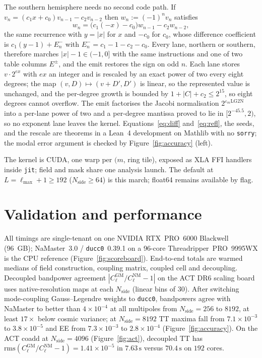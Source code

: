 \documentclass[letters,usenatbib,useAMS]{mnras}
\begin{document}
The southern hemisphere needs no second code path. If $v_n=(c_1x+c_0)v_{n-1}-c_2v_{n-2}$ then $w_n:=(-1)^nv_n$ satisfies
\begin{equation}
\label{eq:refl}
  w_n=\bigl(c_1(-x)-c_0\bigr)w_{n-1}-c_2w_{n-2},
\end{equation}
the same recurrence with $y=\lvert x\rvert$ for $x$ and $-c_0$ for $c_0$, whose difference coefficient is $c_1(y-1)+E^-_n$ with $E^-_n=c_1-1-c_2-c_0$. Every lane, northern or southern, therefore marches $\lvert x\rvert-1\in(-1,0]$ with the same instructions and one of two table columns $E^\pm$, and the emit restores the sign on odd $n$. Each lane stores $v\cdot2^{ex}$ with $ex$ an integer and is rescaled by an exact power of two every eight degrees; the map $(v,D)\mapsto(v+D',D')$ is linear, so the represented value is unchanged, and the per-degree growth is bounded by $1+\lvert C\rvert+c_2\le2^{15}$, so eight degrees cannot overflow. The emit factorises the Jacobi normalisation $2^{\varepsilon_m\mathrm{LG2N}}$ into a per-lane power of two and a per-degree mantissa proved to lie in $[2^{-45.5},2)$, so no exponent lane leaves the kernel. Equations~\eqref{eq:diff} and~\eqref{eq:refl}, the seeds, and the rescale are theorems in a Lean~4 development on Mathlib with no \texttt{sorry}; the modal error argument is checked by Figure~\ref{fig:accuracy} (left).

The kernel is CUDA, one warp per $(m$, ring tile), exposed as XLA FFI handlers inside \texttt{jit}; field and mask share one analysis launch. The default at $L=\ell_{\max}+1\ge192$ ($N_{\mathrm{side}}\ge64$) is this march; float64 remains available by flag.

\section{Validation and performance}

All timings are single-tenant on one NVIDIA RTX~PRO~6000 Blackwell (96~GB); NaMaster~3.0 / \texttt{ducc0}~0.39.1 on a 96-core Threadripper~PRO~9995WX is the CPU reference (Figure~\ref{fig:scoreboard}). End-to-end totals are warmed medians of field construction, coupling matrix, coupled cell and decoupling. Decoupled bandpower agreement $|C_\ell^{\mathrm{GM}}/C_\ell^{\mathrm{NM}}-1|$ on the ACT DR6 scaling board uses native-resolution maps at each $N_{\mathrm{side}}$ (linear bins of $30$). After switching mode-coupling Gauss--Legendre weights to \texttt{ducc0}, bandpowers agree with NaMaster to better than $4\times10^{-4}$ at all multipoles from $N_{\mathrm{side}}=256$ to $8192$, at least $17\times$ below cosmic variance; at $N_{\mathrm{side}}=8192$ TT maxima fall from $7.1\times10^{-3}$ to $3.8\times10^{-5}$ and EE from $7.3\times10^{-3}$ to $2.8\times10^{-4}$ (Figure~\ref{fig:accuracy}). On the ACT coadd at $N_{\mathrm{side}}=4096$ (Figure~\ref{fig:act}), decoupled TT has $\mathrm{rms}(C_\ell^{\mathrm{GM}}/C_\ell^{\mathrm{NM}}-1)=1.41\times10^{-5}$ in $7.63\,\mathrm{s}$ versus $70.4\,\mathrm{s}$ on $192$ cores.
\end{document}
